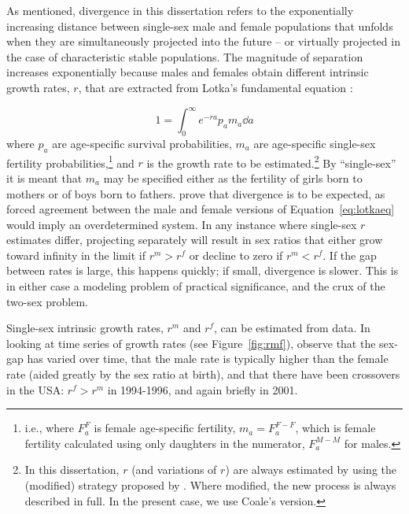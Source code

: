 \FloatBarrier
 \label{sec:divlotkar}
As mentioned, divergence in this dissertation refers to the exponentially
increasing distance between single-sex male and female populations that unfolds
when they are simultaneously projected into the future -- or virtually projected
in the case of characteristic stable populations. The magnitude of separation increases
exponentially because males and females obtain different intrinsic 
growth rates, $r$, that are extracted from Lotka's fundamental equation
\citep{sharpe1911problem}:

\begin{equation}
\label{eq:lotkaeq}
1 = \int _0 ^\infty e^{-ra}p_a m_a \dd a 
\end{equation}
where $p_a$ are age-specific survival probabilities, $m_a$ are age-specific
single-sex fertility probabilities,\footnote{i.e., where $F_a^F$ is female
age-specific fertility,  $m_a = F_a^{F-F}$, which is female fertility calculated
using only daughters in the numerator, $F_a^{M-M}$ for males.} and $r$ is
the growth rate to be estimated.\footnote{In this dissertation, $r$ (and 
variations of $r$) are always estimated by using the (modified) strategy proposed 
by \citet{coale1957new}. Where modified, the new process is always described in full. In the present
case, we use Coale's version.} By ``single-sex'' it is meant that $m_a$ may
be specified either as the fertility of girls born to mothers or of boys born to
fathers. \citet{yellin1977comparison} prove that divergence is to be expected, as 
forced agreement between the male and female versions of Equation~\eqref{eq:lotkaeq}
 would imply an overdetermined system. In any instance
where single-sex $r$ estimates differ, projecting separately will result in sex
ratios that either grow toward infinity in the limit if $r^m
> r^f$ or decline to zero if $r^m < r^f$. If the gap between rates is large, this happens
quickly; if small, divergence is slower. This is in either case a modeling
problem of practical significance, and the crux of the two-sex problem. 

Single-sex intrinsic growth rates, $r^m$ and $r^f$, can be 
estimated from data. In looking at time series of 
 growth rates (see Figure~\ref{fig:rmf}), observe that the sex-gap has varied
 over time, that the male rate is typically higher than the female rate (aided greatly 
by the sex ratio at birth), and that there have been crossovers in the USA: 
$r^f > r^m$ in 1994-1996, and again briefly in 2001. 

